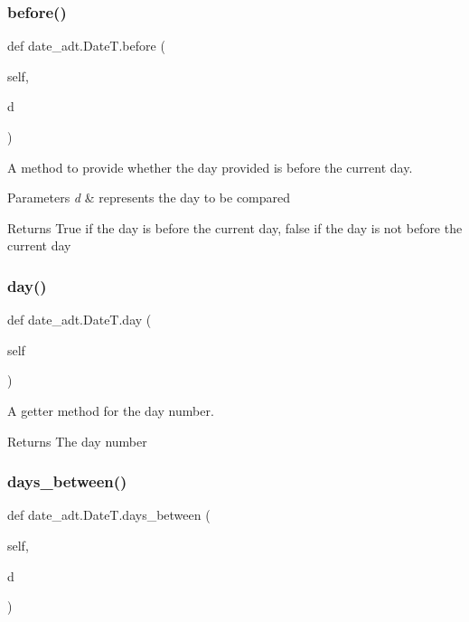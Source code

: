 \subsubsection{\texorpdfstring{before()}{before()}}
{\footnotesize\ttfamily def date\+\_\+adt.\+Date\+T.\+before (\begin{DoxyParamCaption}\item[{}]{self,  }\item[{}]{d }\end{DoxyParamCaption})}



A method to provide whether the day provided is before the current day. 


\begin{DoxyParams}{Parameters}
{\em d} & represents the day to be compared \\
\hline
\end{DoxyParams}
\begin{DoxyReturn}{Returns}
True if the day is before the current day, false if the day is not before the current day 
\end{DoxyReturn}
\mbox{\label{classdate__adt_1_1_date_t_a8ccbd5257d8a6e79fc67fd6ce6b88766}} 
\subsubsection{\texorpdfstring{day()}{day()}}
{\footnotesize\ttfamily def date\+\_\+adt.\+Date\+T.\+day (\begin{DoxyParamCaption}\item[{}]{self }\end{DoxyParamCaption})}



A getter method for the day number. 

\begin{DoxyReturn}{Returns}
The day number 
\end{DoxyReturn}
\mbox{\label{classdate__adt_1_1_date_t_a8592c63d42de5e67f5d0502117c4b4e0}} 
\subsubsection{\texorpdfstring{days\+\_\+between()}{days\_between()}}
{\footnotesize\ttfamily def date\+\_\+adt.\+Date\+T.\+days\+\_\+between (\begin{DoxyParamCaption}\item[{}]{self,  }\item[{}]{d }\end{DoxyParamCaption})}




